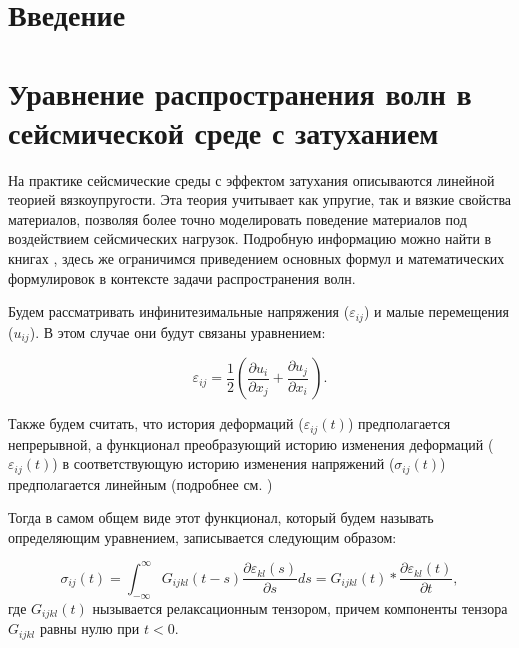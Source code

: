 \documentclass[a4paper, fontsize=14pt]{article}
\begin{document}
\tableofcontents

\newpage

\section*{Введение}
\newpage


\section*{Уравнение распространения волн в сейсмической среде с затуханием} 

На практике сейсмические среды с эффектом затухания описываются линейной теорией вязкоупругости.
Эта теория учитывает как упругие, так и вязкие свойства материалов,
позволяя более точно моделировать поведение материалов под воздействием сейсмических нагрузок. 
Подробную информацию можно найти в книгах \cite{Christenses,Mainardi,Carcione,Borcherdt}, здесь же ограничимся
приведением основных формул и математических формулировок в контексте задачи распространения волн.

Будем рассматривать инфинитезимальные напряжения ($\varepsilon_{ij}$) и малые перемещения ($u_{ij}$).
В этом случае они будут связаны уравнением:

\begin{equation}
    \label{eq:strain_u_rel}
    \varepsilon_{ij} = \frac{1}{2} \left( \frac{\partial u_i}{\partial x_j} + \frac{\partial u_j}{\partial x_i}\, \right). 
\end{equation}

Также будем считать, что история деформаций ($\varepsilon_{ij}(t)$) предполагается непрерывной, а функционал преобразующий историю изменения деформаций ($\varepsilon_{ij}(t)$) в соответствующую историю изменения напряжений ($\sigma_{ij}(t)$) предполагается линейным (подробнее см. \cite{Christenses})

Тогда в самом общем виде этот функционал, который будем называть определяющим уравнением, записывается следующим образом:

\begin{equation}
    \label{eq:hooks_law}
    \sigma_{ij}(t) = \int_{-\infty}^{\infty} G_{ijkl} (t - s) \frac{\partial \varepsilon_{kl} (s)}{\partial s} d s = G_{ijkl}(t) \ast  \frac{\partial \varepsilon_{kl} (t)}{\partial t} ,
\end{equation}
где $G_{ijkl}(t)$ нызывается релаксационным тензором, причем компоненты тензора $G_{ijkl}$ равны нулю при $t < 0$.
\end{document}

